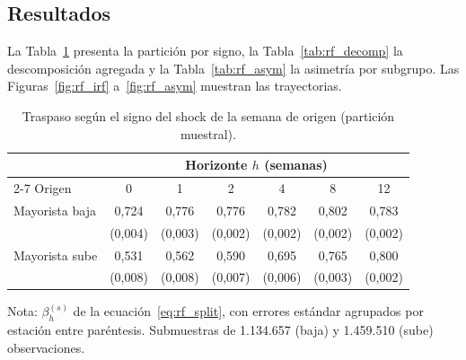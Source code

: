 \documentclass[11pt]{article}
\begin{document}
\subsection{Resultados}
\label{sec:asimetrias_resultados}

La Tabla~\ref{tab:rf_split} presenta la partición por signo, la
Tabla~\ref{tab:rf_decomp} la descomposición agregada y la
Tabla~\ref{tab:rf_asym} la asimetría por subgrupo. Las
Figuras~\ref{fig:rf_irf} a~\ref{fig:rf_asym} muestran las trayectorias.

\begin{table}[htbp]
\centering
\caption{Traspaso según el signo del shock de la semana de origen (partición
muestral).}
\label{tab:rf_split}
\begin{tabular}{lcccccc}
\toprule
 & \multicolumn{6}{c}{Horizonte $h$ (semanas)} \\
\cmidrule(lr){2-7}
Origen & 0 & 1 & 2 & 4 & 8 & 12 \\
\midrule
Mayorista baja & 0,724 & 0,776 & 0,776 & 0,782 & 0,802 & 0,783 \\
               & (0,004) & (0,003) & (0,002) & (0,002) & (0,002) & (0,002) \\
Mayorista sube & 0,531 & 0,562 & 0,590 & 0,695 & 0,765 & 0,800 \\
               & (0,008) & (0,008) & (0,007) & (0,006) & (0,003) & (0,002) \\
\bottomrule
\end{tabular}

\medskip
\begin{minipage}{0.92\textwidth}
\footnotesize
Nota: $\beta_h^{(s)}$ de la ecuación~\eqref{eq:rf_split}, con errores
estándar agrupados por estación entre paréntesis. Submuestras de 1.134.657
(baja) y 1.459.510 (sube) observaciones.
\end{minipage}
\end{table}
\end{document}
